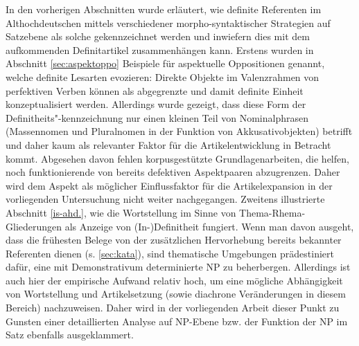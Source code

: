 
In den vorherigen Abschnitten wurde erläutert, wie definite Referenten im Althochdeutschen mittels verschiedener morpho-syntaktischer Strategien auf Satzebene als solche gekennzeichnet werden und inwiefern dies mit dem aufkommenden Definitartikel zusammenhängen kann. Erstens wurden in Abschnitt \ref{sec:aspektoppo} Beispiele für aspektuelle Oppositionen genannt, welche  definite Lesarten evozieren: Direkte Objekte im Valenzrahmen von perfektiven Verben können als abgegrenzte und damit definite Einheit konzeptualisiert werden. Allerdings wurde gezeigt, dass diese Form der Definitheits"-kennzeichnung nur einen kleinen Teil von Nominalphrasen (Massennomen und Pluralnomen in der Funktion von Akkusativobjekten) betrifft und daher kaum als relevanter Faktor für die Artikelentwicklung in Betracht kommt. Abgesehen davon fehlen korpusgestützte Grundlagenarbeiten, die helfen, noch funktionierende von bereits defektiven Aspektpaaren abzugrenzen. Daher wird dem Aspekt als möglicher Einflussfaktor für die Artikelexpansion in der vorliegenden Untersuchung nicht weiter nachgegangen. Zweitens illustrierte Abschnitt \ref{is-ahd.}, wie die Wortstellung im Sinne von Thema-Rhema-Gliederungen als Anzeige von (In-)Definitheit fungiert. Wenn man davon ausgeht, dass die frühesten Belege von  der zusätzlichen Hervorhebung bereits bekannter Referenten dienen (s. \ref{sec:kata}), sind thematische Umgebungen prädestiniert dafür, eine mit Demonstrativum determinierte NP zu beherbergen. Allerdings ist auch hier der empirische Aufwand relativ hoch, um eine mögliche Abhängigkeit von Wortstellung und Artikelsetzung (sowie diachrone Veränderungen in diesem Bereich) nachzuweisen. Daher wird in der vorliegenden Arbeit  dieser Punkt zu Gunsten einer detaillierten Analyse auf NP-Ebene bzw. der Funktion der NP im Satz ebenfalls ausgeklammert.

